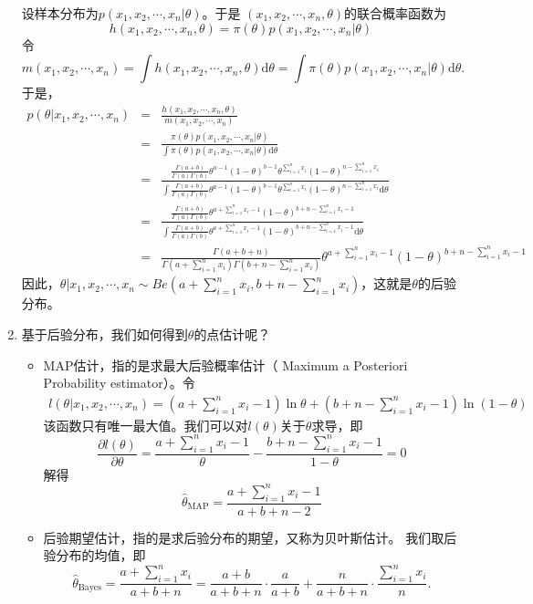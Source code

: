 \begin{example}
\begin{enumerate}
设样本分布为$p(x_1,x_2,\cdots,x_n|\theta)$。于是
$(x_1,x_2,\cdots,x_n,\theta)$的联合概率函数为
$$
 h(x_1,x_2,\cdots,x_n,\theta) = \pi(\theta) p(x_1,x_2,\cdots,x_n|\theta)
$$
令
$$
m(x_1,x_2,\cdots,x_n) = \int h(x_1,x_2,\cdots,x_n,\theta)\text{d}\theta = 
\int  \pi(\theta) p(x_1,x_2,\cdots,x_n|\theta)\text{d}\theta.
$$
于是，
\begin{eqnarray*}
    p(\theta|x_1,x_2,\cdots,x_n) &=& \frac{h(x_1,x_2,\cdots,x_n,\theta)}{m(x_1,x_2,\cdots,x_n) }\\
    &=& \frac{\pi(\theta) p(x_1,x_2,\cdots,x_n|\theta)}{\int  \pi(\theta) p(x_1,x_2,\cdots,x_n|\theta)\text{d}\theta }\\
    &=& \frac{\frac{\Gamma(a+b)}{\Gamma(a)\Gamma(b)}\theta^{a-1}(1-\theta)^{b-1} 
    \theta^{\sum_{i=1}^n x_i} (1-\theta)^{n-\sum_{i=1}^n x_i}}{\int  \frac{\Gamma(a+b)}{\Gamma(a)\Gamma(b)}\theta^{a-1}(1-\theta)^{b-1} 
    \theta^{\sum_{i=1}^n x_i} (1-\theta)^{n-\sum_{i=1}^n x_i}\text{d}\theta }\\
    &=&\frac{\frac{\Gamma(a+b)}{\Gamma(a)\Gamma(b)}\theta^{a+\sum_{i=1}^n x_i -1}(1-\theta)^{b+n-\sum_{i=1}^n x_i-1}}
    {\int  \frac{\Gamma(a+b)}{\Gamma(a)\Gamma(b)}\theta^{a+\sum_{i=1}^n x_i -1}(1-\theta)^{b+n-\sum_{i=1}^n x_i-1}\text{d}\theta }\\
    &=& \frac{\Gamma(a+b+n)}{\Gamma(a+\sum_{i=1}^n x_i)\Gamma(b+n-\sum_{i=1}^n x_i)} \theta^{a+\sum_{i=1}^n x_i -1}(1-\theta)^{b+n-\sum_{i=1}^n x_i-1}
\end{eqnarray*}
因此，$\theta|x_1,x_2,\cdots,x_n \sim Be(a+\sum_{i=1}^n x_i,b+n-\sum_{i=1}^n x_i)$，这就是$\theta$的后验分布。
\item 基于后验分布，我们如何得到$\theta$的点估计呢？
\begin{itemize}
    \item MAP估计，指的是求最大后验概率估计（ Maximum a Posteriori Probability estimator）。令
    \begin{eqnarray*}
        l(\theta|x_1,x_2,\cdots,x_n) = \left(a+\sum_{i=1}^n x_i -1\right) \ln \theta + \left(b+n-\sum_{i=1}^n x_i-1\right) \ln (1-\theta)
    \end{eqnarray*}
    该函数只有唯一最大值。我们可以对$l(\theta)$关于$\theta$求导，即
    $$
    \frac{\partial l(\theta)}{\partial \theta}= \frac{a+\sum_{i=1}^n x_i -1}{\theta} - \frac{b+n-\sum_{i=1}^n x_i-1}{1-\theta} =0
    $$
    解得
    $$
    \hat{\theta}_{\text{MAP}} = \frac{a+\sum_{i=1}^n x_i -1}{a+b+n-2}
    $$
    \item 后验期望估计，指的是求后验分布的期望，又称为贝叶斯估计。
    我们取后验分布的均值，即
$$
\hat{\theta}_{\text{Bayes}} = \frac{a+\sum_{i=1}^n x_i}{a+b+n} = \frac{a+b}{a+b+n} \cdot \frac{a}{a+b} + \frac{n}{a+b+n} \cdot\frac{\sum_{i=1}^n x_i}{n}. 
$$
\end{itemize}
\end{enumerate}
\end{example}

